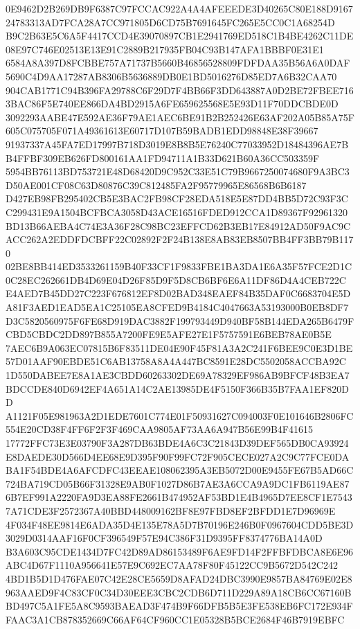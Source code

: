 \documentclass[UTF8,fontset=fandol,zihao=-4,a4paper]{ctexart}
\begin{document}
{{0E9462D2B269DB9F6387C97FCCAC922A4A4AFEEEDE3D40265C80E188D916724783313AD7FCA28A7CC971805D6CD75B7691645FC265E5CC0C1A68254D
B9C2B63E5C6A5F4417CCD4E39070897CB1E2941769ED518C1B4BE4262C11DE08E97C746E02513E13E91C2889B217935FB04C93B147AFA1BBBF0E31E1
6584A8A397D8FCBBE757A71737B5660B46856528809FDFDAA35B56A6A0DAF5690C4D9AA17287AB8306B5636889DB0E1BD5016276D85ED7A6B32CAA70
904CAB1771C94B396FA29788C6F29D7F4BB66F3DD643887A0D2BE72FBEE7163BAC86F5E740EE866DA4BD2915A6FE659625568E5E93D11F70DDCBDE0D
3092293AABE47E592AE36F79AE1AEC6BE91B2B252426E63AF202A05B85A75F605C075705F071A49361613E60717D107B59BADB1EDD98848E38F39667
91937337A45FA7ED17997B718D3019E8B8B5E76240C77033952D18484396AE7BB4FFBF309EB626FD800161AA1FD94711A1B33D621B60A36CC503359F
5954BB76113BD753721E48D68420D9C952C33E51C79B9667250074680F9A3BC3D50AE001CF08C63D80876C39C812485FA2F95779965E86568B6B6187
D427EB98FB295402CB5E3BAC2FB98CF28EDA518E5E87DD4BB5D72C93F3CC299431E9A1504BCFBCA3058D43ACE16516FDED912CCA1D89367F92961320
BD13B66AEBA4C74E3A36F28C98BC23EFFCD62B3EB17E84912AD50F9AC9CACC262A2EDDFDCBFF22C02892F2F24B138E8AB83EB8507BB4FF3BB79B1170
02BE8BB414ED3533261159B40F33CF1F9833FBE1BA3DA1E6A35F57FCE2D1C0C28EC262661DB4D69E04D26F85D9F5D8CB6BF6E6A11DF86D4A4CEB722C
E4AED7B45DD27C223F676812EF8D02BAD348EAEF84B35DAF0C6683704E5DA81F3AED1EAD5EA1C25105EA8CFED9B4184C4047663A53193000B0EB8DF7
D3C5820560975F6FE68D919DAC3882F199793449D940BF58B144EDA265B6479FCBD5CBDC2DD897B855A7200FE9E5AFE27E1F5757591E6BEB78AE0B5E
7AEC6B9A063EC07815B6F83511DE04E90F45F81A3A2C241F6BEE9C0E3D1BE57D01AAF90EBDE51C6AB13758A8A4A447BC8591E28DC5502058ACCBA92C
1D550DABEE7E8A1AE3CBDD60263302DE69A78329EF986AB9BFCF48B3EA7BDCCDE840D6942EF4A651A14C2AE13985DE4F5150F366B35B7FAA1EF820DD
A1121F05E981963A2D1EDE7601C774E01F50931627C094003F0E101646B2806FC554E20CD38F4FF6F2F3F469CAA9805AF73AA6A947B56E99B4F41615
17772FFC73E3E03790F3A287DB63BDE4A6C3C21843D39DEF565DB0CA93924E8DAEDE30D566D4EE68E9D395F90F99FC72F905CECE027A2C9C77FCE0DA
BA1F54BDE4A6AFCDFC43EEAE108062395A3EB5072D00E9455FE67B5AD66C724BA719CD05B66F31328E9AB0F1027D86B7AE3A6CCA9A9DC1FB6119AE87
6B7EF991A2220FA9D3EA88FE2661B474952AF53BD1E4B4965D7EE8CF1E75437A71CDE3F2572367A40BBD448009162BF8E97FBD8EF2BFDD1E7D96969E
4F034F48EE9814E6ADA35D4E135E78A5D7B70196E246B0F0967604CDD5BE3D3029D0314AAF16F0CF396549F57E94C386F31D9395FF8374776BA14A0D
B3A603C95CDE1434D7FC42D89AD86153489F6AE9FD14F2FFBFDBCA8E6E96ABC4D67F1110A956641E57E9C692EC7AA78F80F45122CC9B5672D542C242
4BD1B5D1D476FAE07C42E28CE5659D8AFAD24DBC3990E9857BA84769E02E8963AAED9F4C83CF0C34D30EEE3CBC2CDB6D711D229A89A18CB6CC67160B
BD497C5A1FE5A8C9593BAEAD3F474B9F66DFB5B5E3FE538EB6FC172E934FFAAC3A1CB878352669C66AF64CF960CC1E05328B5BCE2684F46B7919EBFC
}}
\end{document}
